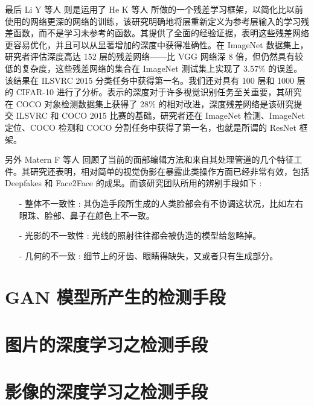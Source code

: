 最后 Li Y 等人 \cite{li2018exposing} 则是运用了 He K 等人 \cite{he2016deep}所做的一个残差学习框架，以简化比以前使用的网络更深的网络的训练，该研究明确地将层重新定义为参考层输入的学习残差函数，而不是学习未参考的函数。其提供了全面的经验证据，表明这些残差网络更容易优化，并且可以从显著增加的深度中获得准确性。在 ImageNet 数据集上，研究者评估深度高达 152 层的残差网络——比 VGG 网络深 8 倍，但仍然具有较低的复杂度，这些残差网络的集合在 ImageNet 测试集上实现了 3.57\% 的误差。该结果在 ILSVRC 2015 分类任务中获得第一名。我们还对具有 100 层和 1000 层的 CIFAR-10 进行了分析。表示的深度对于许多视觉识别任务至关重要，其研究在 COCO 对象检测数据集上获得了 28\% 的相对改进，深度残差网络是该研究提交 ILSVRC 和 COCO 2015 比赛的基础，研究者还在 ImageNet 检测、ImageNet 定位、COCO 检测和 COCO 分割任务中获得了第一名，也就是所谓的 ResNet 框架。

另外 Matern F 等人 \cite{matern2019exploiting} 回顾了当前的面部编辑方法和来自其处理管道的几个特征工件。其研究还表明，相对简单的视觉伪影在暴露此类操作方面已经非常有效，包括 Deepfakes 和 Face2Face 的成果。而该研究团队所用的辨别手段如下 :

\begin{itemize}
\item [-] 整体不一致性 : 其伪造手段所生成的人类脸部会有不协调这状况，比如左右眼珠、脸部、鼻子在颜色上不一致。
\item [-] 光影的不一致性 : 光线的照射往往都会被伪造的模型给忽略掉。
\item [-] 几何的不一致 : 细节上的牙齿、眼睛得缺失，又或者只有生成部分。
\end{itemize}

\section{ GAN 模型所产生的检测手段}


\section{图片的深度学习之检测手段}


\section{影像的深度学习之检测手段}















